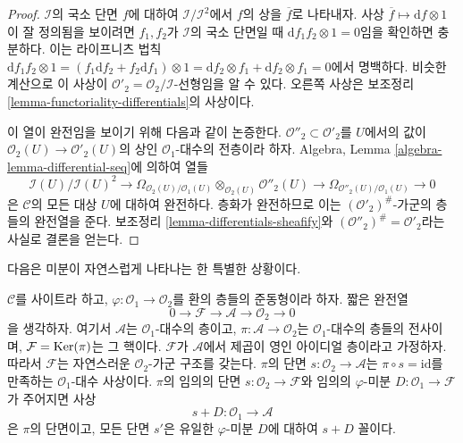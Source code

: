 \begin{proof}
$\mathcal{I}$의 국소 단면 $f$에 대하여
$\mathcal{I}/\mathcal{I}^2$에서 $f$의 상을 $\overline{f}$로 나타내자.
사상 $\overline{f} \mapsto \text{d}f \otimes 1$이 잘 정의됨을 보이려면
$f_1, f_2$가 $\mathcal{I}$의 국소 단면일 때
$\text{d} f_1f_2 \otimes 1 = 0$임을 확인하면 충분하다.
이는 라이프니츠 법칙
$\text{d} f_1f_2 \otimes 1 =
(f_1 \text{d}f_2 + f_2 \text{d} f_1 )\otimes 1 =
\text{d}f_2 \otimes f_1 + \text{d}f_2 \otimes f_1 = 0$에서 명백하다.
비슷한 계산으로 이 사상이
$\mathcal{O}'_2 = \mathcal{O}_2/\mathcal{I}$-선형임을 알 수 있다.
오른쪽 사상은 보조정리 \ref{lemma-functoriality-differentials}의 사상이다.

\medskip\noindent
이 열이 완전임을 보이기 위해 다음과 같이 논증한다.
$\mathcal{O}''_2 \subset \mathcal{O}'_2$를 $U$에서의 값이
$\mathcal{O}_2(U) \to \mathcal{O}'_2(U)$의 상인
$\mathcal{O}_1$-대수의 전층이라 하자. Algebra, Lemma
\ref{algebra-lemma-differential-seq}에 의하여 열들
$$
\mathcal{I}(U)/\mathcal{I}(U)^2
\longrightarrow
\Omega_{\mathcal{O}_2(U)/\mathcal{O}_1(U)}
\otimes_{\mathcal{O}_2(U)} \mathcal{O}''_2(U)
\longrightarrow
\Omega_{\mathcal{O}''_2(U)/\mathcal{O}_1(U)}
\longrightarrow
0
$$
은 $\mathcal{C}$의 모든 대상 $U$에 대하여 완전하다. 층화가 완전하므로
이는 $(\mathcal{O}'_2)^\#$-가군의 층들의 완전열을 준다.
보조정리 \ref{lemma-differentials-sheafify}와
$(\mathcal{O}''_2)^\# = \mathcal{O}'_2$라는 사실로 결론을 얻는다.
\end{proof}

\noindent
다음은 미분이 자연스럽게 나타나는 한 특별한 상황이다.

\begin{lemma}
\label{lemma-double-structure-gives-derivation}
$\mathcal{C}$를 사이트라 하고, $\varphi : \mathcal{O}_1 \to \mathcal{O}_2$를
환의 층들의 준동형이라 하자. 짧은 완전열
$$
0 \to \mathcal{F} \to \mathcal{A} \to \mathcal{O}_2 \to 0
$$
을 생각하자. 여기서 $\mathcal{A}$는 $\mathcal{O}_1$-대수의 층이고,
$\pi : \mathcal{A} \to \mathcal{O}_2$는 $\mathcal{O}_1$-대수의 층들의
전사이며, $\mathcal{F} = \mathop{\mathrm{Ker}}(\pi)$는 그 핵이다. $\mathcal{F}$가
$\mathcal{A}$에서 제곱이 영인 아이디얼 층이라고 가정하자. 따라서
$\mathcal{F}$는 자연스러운 $\mathcal{O}_2$-가군 구조를 갖는다.
$\pi$의 단면 $s : \mathcal{O}_2 \to \mathcal{A}$는
$\pi \circ s = \text{id}$를 만족하는 $\mathcal{O}_1$-대수 사상이다.
$\pi$의 임의의 단면 $s : \mathcal{O}_2 \to \mathcal{F}$와 임의의
$\varphi$-미분 $D : \mathcal{O}_1 \to \mathcal{F}$가 주어지면 사상
$$
s + D : \mathcal{O}_1 \to \mathcal{A}
$$
은 $\pi$의 단면이고, 모든 단면 $s'$은 유일한 $\varphi$-미분 $D$에
대하여 $s + D$ 꼴이다.
\end{lemma}

